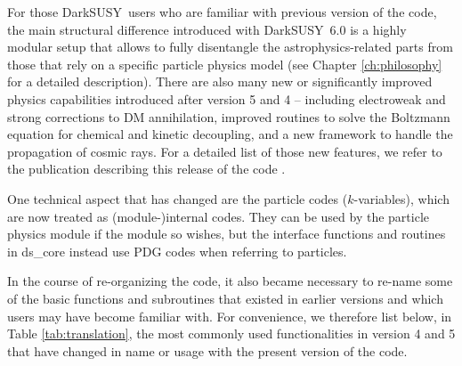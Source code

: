 \documentclass[a4paper,10pt,oneside]{book}
\newcommand{\code}[1]{\ft{#1}}
\newcommand{\ds}{{\sffamily DarkSUSY}}
\newcommand{\ft}[1]{\textsf{#1}}
\begin{document}
For those \ds\ users who are familiar with previous version of the code, the main 
structural difference introduced with \ds\ 6.0 is a highly modular setup that allows to 
fully disentangle the astrophysics-related parts from those that rely on a specific particle
physics model (see Chapter 
\ref{ch:philosophy} for a detailed description). There are also many new or significantly 
improved physics capabilities introduced after version 5 and 4 \cite{ds4} -- including 
electroweak and strong corrections to DM annihilation, improved routines to solve
the Boltzmann equation for chemical and kinetic decoupling, and a new framework to handle 
the propagation of cosmic rays. For a detailed list of those new features, we refer to the 
publication describing this release of the code \cite{ds6}.


One technical aspect that has changed are the particle codes ($k$-variables), which are 
now treated as (module-)internal codes. They can be used by the particle physics module if the 
module so wishes, but the interface functions and routines in \code{ds\_core} instead 
use PDG codes when referring to particles.

In the course of re-organizing the code, it also became necessary to re-name some of the 
basic functions and subroutines that existed in earlier versions and which users may have
become familiar with. For convenience, we therefore list below, in Table \ref{tab:translation},
 the most commonly used functionalities in version 4 and 5 that have changed in name or 
 usage with the present version of the code.
\end{document}
